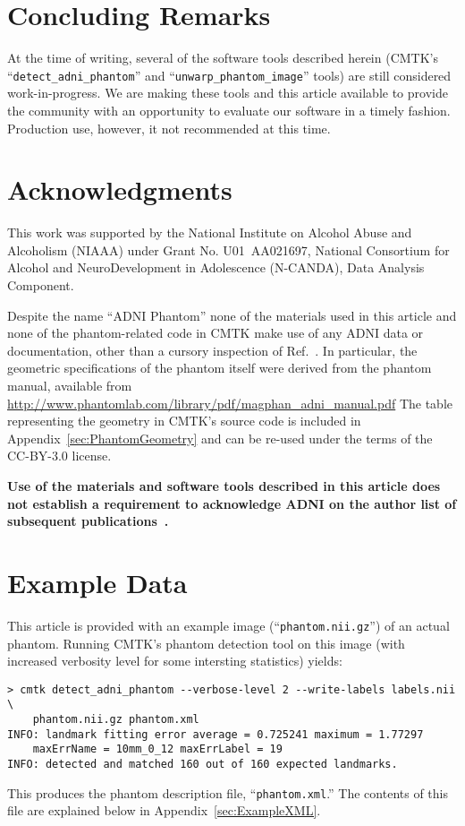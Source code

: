 \documentclass{InsightArticle}
\begin{document}
\section{Concluding Remarks}

At the time of writing, several of the software tools described herein (CMTK's
``\texttt{detect\_adni\_phantom}'' and ``\texttt{unwarp\_phantom\_image}''
tools) are still considered work-in-progress. We are making these tools and
this article available to provide the community with an opportunity to
evaluate our software in a timely fashion. Production use, however, it not
recommended at this time.

\section*{Acknowledgments}

This work was supported by the National Institute on Alcohol Abuse and
Alcoholism (NIAAA) under Grant No. U01~AA021697, National Consortium for
Alcohol and NeuroDevelopment in Adolescence (N-CANDA), Data Analysis
Component.

Despite the name ``ADNI Phantom'' none of the materials used in this article
and none of the phantom-related code in CMTK make use of any ADNI data or
documentation, other than a cursory inspection of
Ref.~\cite{GuntBernBoro:2009}. In particular, the geometric specifications of
the phantom itself were derived from the phantom manual, available from
\url{http://www.phantomlab.com/library/pdf/magphan_adni_manual.pdf} The table
representing the geometry in CMTK's source code is included in
Appendix~\ref{sec:PhantomGeometry} and can be re-used under the terms of the
CC-BY-3.0 license.

{\bf Use of the materials and software tools described in this article does not
establish a requirement to acknowledge ADNI on the author list of subsequent
publications~\cite{RohlPoli:2012}.}




\clearpage
\appendix

\section{Example Data}

This article is provided with an example image (``\texttt{phantom.nii.gz}'')
of an actual phantom. Running CMTK's phantom detection tool on this image
(with increased verbosity level for some intersting statistics) yields:
\begin{verbatim}
> cmtk detect_adni_phantom --verbose-level 2 --write-labels labels.nii \
    phantom.nii.gz phantom.xml
INFO: landmark fitting error average = 0.725241 maximum = 1.77297 
    maxErrName = 10mm_0_12 maxErrLabel = 19
INFO: detected and matched 160 out of 160 expected landmarks.
\end{verbatim}
This produces the phantom description file, ``\texttt{phantom.xml}.'' The
contents of this file are explained below in Appendix~\ref{sec:ExampleXML}.
\end{document}
